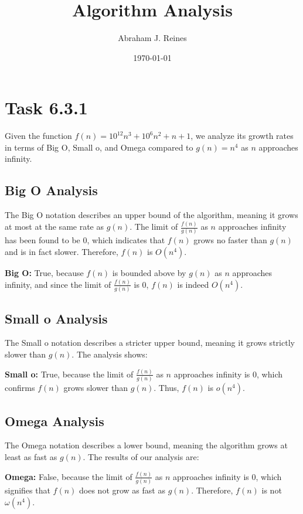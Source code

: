 \documentclass{article}
\title{Algorithm Analysis}
\author{Abraham J. Reines} %
\date{\today} %
\begin{document}
\maketitle

\section*{Task 6.3.1}

Given the function \( f(n) = 10^{12}n^3 + 10^6n^2 + n + 1 \), we analyze its growth rates in terms of Big O, Small o, and Omega compared to \( g(n) = n^4 \) as \( n \) approaches infinity.

\subsection*{Big O Analysis}
The Big O notation describes an upper bound of the algorithm, meaning it grows at most at the same rate as \( g(n) \). The limit of \( \frac{f(n)}{g(n)} \) as \( n \) approaches infinity has been found to be 0, which indicates that \( f(n) \) grows no faster than \( g(n) \) and is in fact slower. Therefore, \( f(n) \) is \( O(n^4) \).

\textbf{Big O:} True, because \( f(n) \) is bounded above by \( g(n) \) as \( n \) approaches infinity, and since the limit of \( \frac{f(n)}{g(n)} \) is 0, \( f(n) \) is indeed \( O(n^4) \).

\subsection*{Small o Analysis}
The Small o notation describes a stricter upper bound, meaning it grows strictly slower than \( g(n) \). The analysis shows:

\textbf{Small o:} True, because the limit of \( \frac{f(n)}{g(n)} \) as \( n \) approaches infinity is 0, which confirms \( f(n) \) grows slower than \( g(n) \). Thus, \( f(n) \) is \( o(n^4) \).

\subsection*{Omega Analysis}
The Omega notation describes a lower bound, meaning the algorithm grows at least as fast as \( g(n) \). The results of our analysis are:

\textbf{Omega:} False, because the limit of \( \frac{f(n)}{g(n)} \) as \( n \) approaches infinity is 0, which signifies that \( f(n) \) does not grow as fast as \( g(n) \). Therefore, \( f(n) \) is not \( \omega(n^4) \).
\end{document}

